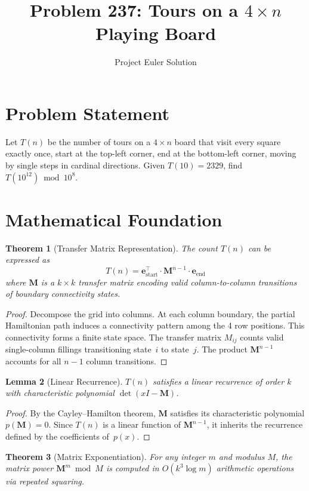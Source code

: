 \documentclass[12pt]{article}
\title{Problem 237: Tours on a $4 \times n$ Playing Board}
\author{Project Euler Solution}
\date{}
\newtheorem{theorem}{Theorem}
\newtheorem{lemma}[theorem]{Lemma}
\begin{document}
\maketitle

\section{Problem Statement}
Let $T(n)$ be the number of tours on a $4 \times n$ board that visit every square exactly once, start at the top-left corner, end at the bottom-left corner, moving by single steps in cardinal directions. Given $T(10) = 2329$, find $T(10^{12}) \bmod 10^8$.

\section{Mathematical Foundation}

\begin{theorem}[Transfer Matrix Representation]
The count $T(n)$ can be expressed as
\[
T(n) = \mathbf{e}_{\mathrm{start}}^\top \cdot \mathbf{M}^{n-1} \cdot \mathbf{e}_{\mathrm{end}}
\]
where $\mathbf{M}$ is a $k \times k$ transfer matrix encoding valid column-to-column transitions of boundary connectivity states.
\end{theorem}

\begin{proof}
Decompose the grid into columns. At each column boundary, the partial Hamiltonian path induces a connectivity pattern among the 4 row positions. This connectivity forms a finite state space. The transfer matrix $M_{ij}$ counts valid single-column fillings transitioning state~$i$ to state~$j$. The product $\mathbf{M}^{n-1}$ accounts for all $n-1$ column transitions.
\end{proof}

\begin{lemma}[Linear Recurrence]
$T(n)$ satisfies a linear recurrence of order $k$ with characteristic polynomial $\det(xI - \mathbf{M})$.
\end{lemma}

\begin{proof}
By the Cayley--Hamilton theorem, $\mathbf{M}$ satisfies its characteristic polynomial $p(\mathbf{M}) = 0$. Since $T(n)$ is a linear function of $\mathbf{M}^{n-1}$, it inherits the recurrence defined by the coefficients of~$p(x)$.
\end{proof}

\begin{theorem}[Matrix Exponentiation]
For any integer $m$ and modulus $M$, the matrix power $\mathbf{M}^m \bmod M$ is computed in $O(k^3 \log m)$ arithmetic operations via repeated squaring.
\end{theorem}
\end{document}
